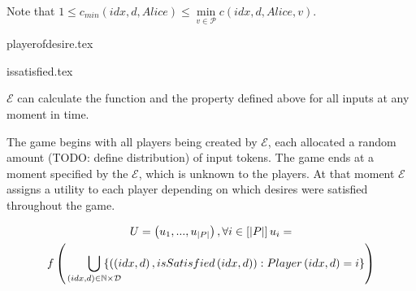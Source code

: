   \noindent Note that $1 \leq c_{min}\left(idx, d, Alice\right) \leq \min\limits_{v \in \mathcal{P}}{c\left(idx, d, Alice,
  v\right)}$.

  {playerofdesire.tex}

  {issatisfied.tex}

  $\mathcal{E}$ can calculate the function and the property defined above for all inputs at any moment in time.

  The game begins with all players being created by $\mathcal{E}$, each allocated a random amount (TODO: define distribution)
  of input tokens. The game ends at a moment specified by the $\mathcal{E}$, which is unknown to the players. At that moment
  $\mathcal{E}$ assigns a utility to each player depending on which desires were satisfied throughout the game.

  \begin{gather*}
    U = \left(u_1, ..., u_{|P|}\right), \forall i \in \left[|P|\right] u_i = \\
    f\left(\;\;\;\;\;\;\;\bigcup\limits_{\mathclap{\left(idx, d\right) \in \mathbb{N} \times \mathcal{D}}}\;\{\left(\left(idx,
    d\right), isSatisfied\left(idx, d\right)\right) : Player\left(idx, d\right) = i\}\right)
  \end{gather*}
